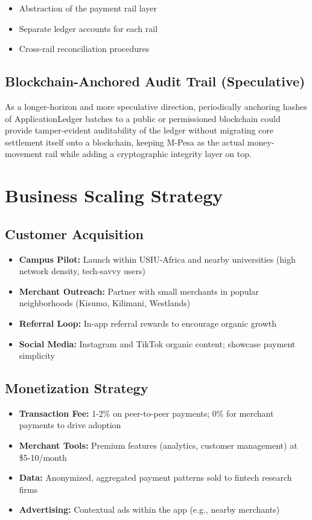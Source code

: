\documentclass[12pt, a4paper, twoside, openright]{report}
\begin{document}
\begin{itemize}
    \item Abstraction of the payment rail layer
    \item Separate ledger accounts for each rail
    \item Cross-rail reconciliation procedures
\end{itemize}

\subsection{Blockchain-Anchored Audit Trail (Speculative)}

As a longer-horizon and more speculative direction, periodically anchoring hashes of ApplicationLedger batches to a public or permissioned blockchain could provide tamper-evident auditability of the ledger without migrating core settlement itself onto a blockchain, keeping M-Pesa as the actual money-movement rail while adding a cryptographic integrity layer on top.

\section{Business Scaling Strategy}

\subsection{Customer Acquisition}

\begin{itemize}
    \item \textbf{Campus Pilot:} Launch within USIU-Africa and nearby universities (high network density, tech-savvy users)
    \item \textbf{Merchant Outreach:} Partner with small merchants in popular neighborhoods (Kisumo, Kilimani, Westlands)
    \item \textbf{Referral Loop:} In-app referral rewards to encourage organic growth
    \item \textbf{Social Media:} Instagram and TikTok organic content; showcase payment simplicity
\end{itemize}

\subsection{Monetization Strategy}

\begin{itemize}
    \item \textbf{Transaction Fee:} 1-2\% on peer-to-peer payments; 0\% for merchant payments to drive adoption
    \item \textbf{Merchant Tools:} Premium features (analytics, customer management) at \$5-10/month
    \item \textbf{Data:} Anonymized, aggregated payment patterns sold to fintech research firms
    \item \textbf{Advertising:} Contextual ads within the app (e.g., nearby merchants)
\end{itemize}
\end{document}
